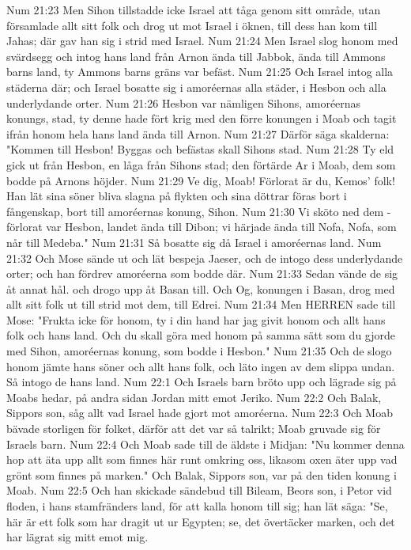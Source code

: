 Num 21:23  Men Sihon tillstadde icke Israel att tåga genom sitt område, utan församlade allt sitt folk och drog ut mot Israel i öknen, till dess han kom till Jahas; där gav han sig i strid med Israel.
Num 21:24  Men Israel slog honom med svärdsegg och intog hans land från Arnon ända till Jabbok, ända till Ammons barns land, ty Ammons barns gräns var befäst.
Num 21:25  Och Israel intog alla städerna där; och Israel bosatte sig i amoréernas alla städer, i Hesbon och alla underlydande orter.
Num 21:26  Hesbon var nämligen Sihons, amoréernas konungs, stad, ty denne hade fört krig med den förre konungen i Moab och tagit ifrån honom hela hans land ända till Arnon.
Num 21:27  Därför säga skalderna: "Kommen till Hesbon! Byggas och befästas skall Sihons stad.
Num 21:28  Ty eld gick ut från Hesbon, en låga från Sihons stad; den förtärde Ar i Moab, dem som bodde på Arnons höjder.
Num 21:29  Ve dig, Moab! Förlorat är du, Kemos' folk! Han lät sina söner bliva slagna på flykten och sina döttrar föras bort i fångenskap, bort till amoréernas konung, Sihon.
Num 21:30  Vi sköto ned dem - förlorat var Hesbon, landet ända till Dibon; vi härjade ända till Nofa, Nofa, som når till Medeba."
Num 21:31  Så bosatte sig då Israel i amoréernas land.
Num 21:32  Och Mose sände ut och lät bespeja Jaeser, och de intogo dess underlydande orter; och han fördrev amoréerna som bodde där.
Num 21:33  Sedan vände de sig åt annat hål. och drogo upp åt Basan till. Och Og, konungen i Basan, drog med allt sitt folk ut till strid mot dem, till Edrei.
Num 21:34  Men HERREN sade till Mose: "Frukta icke för honom, ty i din hand har jag givit honom och allt hans folk och hans land. Och du skall göra med honom på samma sätt som du gjorde med Sihon, amoréernas konung, som bodde i Hesbon."
Num 21:35  Och de slogo honom jämte hans söner och allt hans folk, och läto ingen av dem slippa undan. Så intogo de hans land.
Num 22:1  Och Israels barn bröto upp och lägrade sig på Moabs hedar, på andra sidan Jordan mitt emot Jeriko.
Num 22:2  Och Balak, Sippors son, såg allt vad Israel hade gjort mot amoréerna.
Num 22:3  Och Moab bävade storligen för folket, därför att det var så talrikt; Moab gruvade sig för Israels barn.
Num 22:4  Och Moab sade till de äldste i Midjan: "Nu kommer denna hop att äta upp allt som finnes här runt omkring oss, likasom oxen äter upp vad grönt som finnes på marken." Och Balak, Sippors son, var på den tiden konung i Moab.
Num 22:5  Och han skickade sändebud till Bileam, Beors son, i Petor vid floden, i hans stamfränders land, för att kalla honom till sig; han lät säga: "Se, här är ett folk som har dragit ut ur Egypten; se, det övertäcker marken, och det har lägrat sig mitt emot mig.
